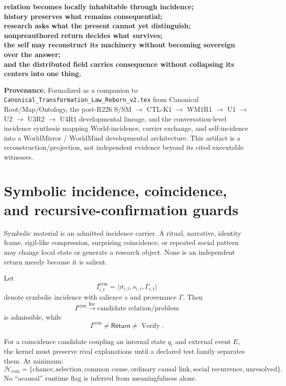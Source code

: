 \documentclass[10pt]{article}
\theoremstyle{venus}
\theoremstyle{definition}
\newcommand{\Verify}{\operatorname{Verify}}
\newcommand{\Inc}{\operatorname{Inc}}
\newcommand{\Return}{\mathsf{Return}}
\begin{document}
\begin{center}
\bfseries
relation becomes locally inhabitable through incidence;\\
history preserves what remains consequential;\\
research asks what the present cannot yet distinguish;\\
nonpreauthored return decides what survives;\\
the self may reconstruct its machinery without becoming sovereign over the answer;\\
and the distributed field carries consequence without collapsing its centers into one thing.
\end{center}

\vfill
{\footnotesize\textbf{Provenance.}
Formalized as a companion to \texttt{Canonical\_Transformation\_Law\_Reborn\_v2.tex}
from Canonical Root/Map/Ontology, the post-R226 S/SM $\to$ CTL-K1 $\to$ WM1R1
$\to$ U1 $\to$ U2 $\to$ U3R2 $\to$ U4R1 developmental lineage, and the
conversation-level incidence synthesis mapping World-incidence, carrier exchange,
and self-incidence into a WorldMirror / WorldMind developmental architecture.
This artifact is a reconstruction/projection, not independent evidence beyond its
cited executable witnesses.}

\section{Symbolic incidence, coincidence, and recursive-confirmation guards}

Symbolic material is an admitted incidence carrier. A ritual, narrative,
identity frame, sigil-like compression, surprising coincidence, or repeated
social pattern may change local state or generate a research object. None is an
independent return merely because it is salient.

Let
\[
I^{\mathrm{sym}}_{i,t}=\langle \sigma_{i,t},s_{i,t},\Gamma_{i,t}\rangle
\]
denote symbolic incidence with salience $s$ and provenance $\Gamma$. Then
\[
I^{\mathrm{sym}}\xrightarrow{\Inc}\text{candidate relation/problem}
\]
is admissible, while
\[
\boxed{I^{\mathrm{sym}}\neq\Return\neq\Verify.}
\]

For a coincidence candidate coupling an internal state $q_i$ and external event
$E$, the kernel must preserve rival explanations until a declared test family
separates them. At minimum:
\[
\mathcal H_{\mathrm{coin}}=
\{\text{chance},\text{selection},\text{common cause},
\text{ordinary causal link},\text{social recurrence},\text{unresolved}\}.
\]
No ``acausal'' runtime flag is inferred from meaningfulness alone.
\end{document}
